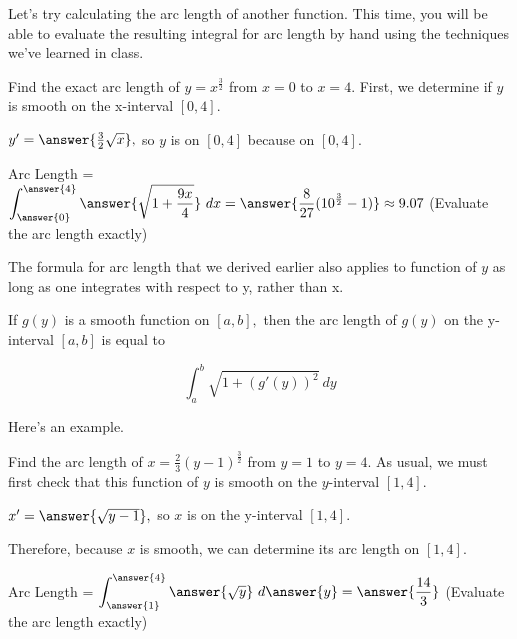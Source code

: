 \documentclass[handout,nooutcomes]{ximera}
\begin{document}
Let's try calculating the arc length of another function.  This time, you will be able to evaluate the resulting integral for arc length by hand using the techniques we've learned in class.


\begin{problem}

Find the exact arc length of $y = x^{\frac{3}{2}}$ from $x=0$ to $x=4$.  First, we determine if $y$ is smooth on the x-interval $[0,4]$.  

$y' = \answer{\frac{3}{2}\sqrt{x}},$ so $y$ is  on $[0,4]$ because  on $[0,4]$.  

\begin{problem}

Arc Length = $\displaystyle\int_{\answer{0}}^{\answer{4}} \answer{\sqrt{1+\frac{9x}{4}}} \ dx = \answer{\frac{8}{27}(10^{\frac{3}{2}}-1)} \approx 9.07$ (Evaluate the arc length exactly)

\end{problem}
\end{problem}

The formula for arc length that we derived earlier also applies to function of $y$ as long as one integrates with respect to y, rather than x.  

\begin{theorem}
If $g(y)$ is a smooth function on $[a,b],$ then the arc length of $g(y)$ on the y-interval $[a,b]$ is equal to 

$$\displaystyle\int_{a}^{b} \sqrt{1+(g'(y))^2} \ dy$$

\end{theorem}

Here's an example.  


\begin{problem}
Find the arc length of $x = \frac{2}{3} (y-1)^{\frac{3}{2}}$ from $y=1$ to $y=4$.  As usual, we must first check that this function of $y$ is smooth on the $y$-interval $[1,4]$.  

$x' = \answer{\sqrt{y-1}},$ so $x$ is  on the y-interval $[1,4]$.

\begin{problem}
Therefore, because $x$ is smooth, we can determine its arc length on $[1,4]$.

Arc Length = $\displaystyle\int_{\answer{1}}^{\answer{4}} \answer{\sqrt{y}} \ d\answer{y} = \answer{\frac{14}{3}}$ (Evaluate the arc length exactly)

\end{problem}

\end{problem}
\end{document}
